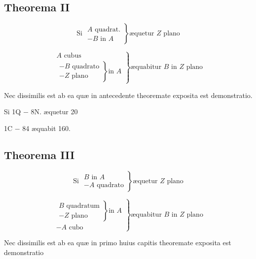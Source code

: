 \documentclass[11pt,a4paper]{article}
\begin{document}
\subsection*{Theorema II}

\[ \text{Si } \left.\begin{array}{l} A \text{ quadrat.} \\ - B \text{ in } A \end{array}\right\} \text{æquetur } Z \text{ plano} \]

\[ \left.\begin{array}{l} A \text{ cubus} \\ \left.\begin{array}{l} - B \text{ quadrato} \\ - Z \text{ plano} \end{array}\right\} \text{in } A \end{array}\right\} \text{æquabitur } B \text{ in } Z \text{ plano} \]

Nec dissimilis est ab ea quæ in antecedente theoremate exposita est demonstratio.


Si 1Q $-$ 8N. æquetur 20

1C $-$ 84 æquabit 160.

\subsection*{Theorema III}

\[ \text{Si } \left.\begin{array}{l} B \text{ in } A \\ - A \text{ quadrato} \end{array}\right\} \text{æquetur } Z \text{ plano} \]

\[ \left.\begin{array}{l} \left.\begin{array}{l} B \text{ quadratum} \\ - Z \text{ plano} \end{array}\right\} \text{in } A \\ - A \text{ cubo} \end{array}\right\} \text{æquabitur } B \text{ in } Z \text{ plano} \]

Nec dissimilis est ab ea quæ in primo huius capitis theoremate exposita est demonstratio

\end{document}
